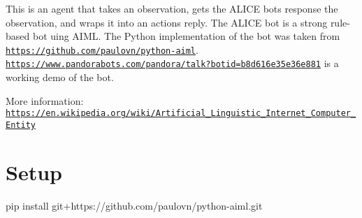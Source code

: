 This is an agent that takes an observation, gets the A\+L\+I\+CE bot\textquotesingle{}s response the observation, and wraps it into an action\textquotesingle{}s reply. The A\+L\+I\+CE bot is a strong rule-\/based bot uing A\+I\+ML. The Python implementation of the bot was taken from \href{https://github.com/paulovn/python-aiml}{\tt https\+://github.\+com/paulovn/python-\/aiml}. \href{https://www.pandorabots.com/pandora/talk?botid=b8d616e35e36e881}{\tt https\+://www.\+pandorabots.\+com/pandora/talk?botid=b8d616e35e36e881} is a working demo of the bot.

More information\+: \href{https://en.wikipedia.org/wiki/Artificial_Linguistic_Internet_Computer_Entity}{\tt https\+://en.\+wikipedia.\+org/wiki/\+Artificial\+\_\+\+Linguistic\+\_\+\+Internet\+\_\+\+Computer\+\_\+\+Entity}

\section*{Setup}

pip install git+https\+://github.com/paulovn/python-\/aiml.\+git 